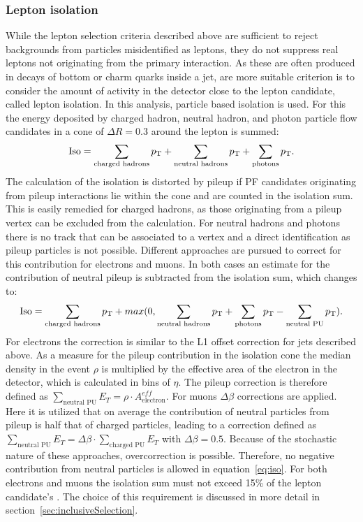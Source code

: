 \subsubsection{Lepton isolation}
While the lepton selection criteria described above are sufficient to reject backgrounds from particles misidentified as leptons, they do not suppress real leptons not originating from the primary interaction. As these are often produced in decays of bottom or charm quarks inside a jet, are more suitable criterion is to consider the amount of activity in the detector close to the lepton candidate, called lepton isolation. In this analysis, particle based isolation is used. For this the energy deposited by charged hadron, neutral hadron, and photon particle flow candidates in a cone of $\Delta R = 0.3$ around the lepton is summed:
\begin{equation}
\text{Iso} = \sum\limits_{\text{charged hadrons}} p_{\mathrm{T}} + \sum\limits_{\text{neutral hadrons}} p_{\mathrm{T}} + \sum\limits_{\text{photons}} p_{\mathrm{T}}.
\end{equation}
The calculation of the isolation is distorted by pileup if PF candidates originating from pileup interactions lie within the cone and are counted in the isolation sum. This is easily remedied for charged hadrons, as those originating from a pileup vertex can be excluded from the calculation. For neutral hadrons and photons there is no track that can be associated to a vertex and a direct identification as pileup particles is not possible. Different approaches are pursued to correct for this contribution for electrons and muons. In both cases an estimate for the contribution of neutral pileup is subtracted from the isolation sum, which changes to:
\begin{equation}
\text{Iso} = \sum\limits_{\text{charged hadrons}} p_{\mathrm{T}} + max(0, \sum\limits_{\text{neutral hadrons}} p_{\mathrm{T}} + \sum\limits_{\text{photons}} p_{\mathrm{T}} - \sum\limits_{\text{neutral PU}} p_{\mathrm{T}}). 
\label{eq:iso}
\end{equation}
For electrons the correction is similar to the L1 offset correction for jets described above. As a measure for the pileup contribution in the isolation cone the median \pt density in the event $\rho$ is multiplied by the effective area of the electron in the detector, which is calculated in bins of $\eta$. The pileup correction is therefore defined as $\sum\limits_{\text{neutral PU}} E_T = \rho\cdot A^{eff}_{\text{electron}}$. For muons $\Delta \beta$ corrections are applied. Here it is utilized that on average the contribution of neutral particles from pileup is half that of charged particles, leading to a correction defined as $\sum\limits_{\text{neutral PU}} E_T = \Delta\beta\cdot \sum\limits_{\text{charged PU}} E_T$ with $\Delta\beta = 0.5$. Because of the stochastic nature of these approaches, overcorrection is possible. Therefore, no negative contribution from neutral particles is allowed in equation~\ref{eq:iso}. For both electrons and muons the isolation sum must not exceed  15\% of the lepton candidate's \pt. The choice of this requirement is discussed in more detail in section~\ref{sec:inclusiveSelection}.


